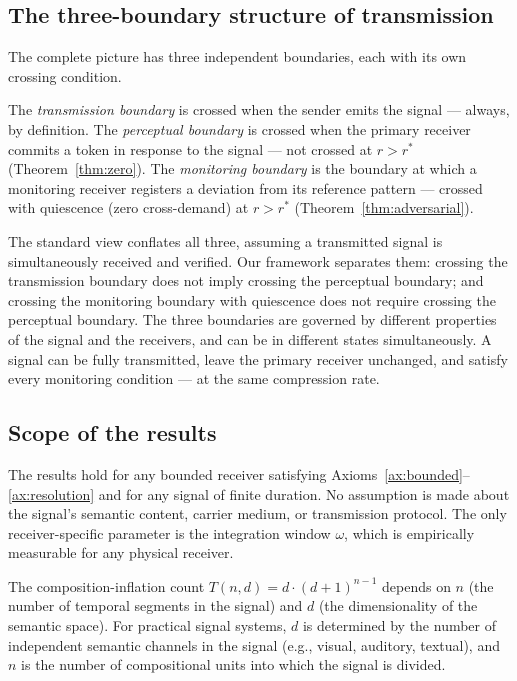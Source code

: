 \documentclass[twocolumn,11pt,a4paper]{article}
\theoremstyle{main}
\theoremstyle{definition}
\theoremstyle{remark}
\newcommand{\Traj}{T}
\newcommand{\rate}{r}
\newcommand{\window}{\omega}
\begin{document}
\subsection{The three-boundary structure of transmission}

The complete picture has three independent boundaries, each with its
own crossing condition.

The \emph{transmission boundary} is crossed when the sender emits the
signal --- always, by definition. The \emph{perceptual boundary} is
crossed when the primary receiver commits a token in response to the
signal --- not crossed at $\rate > \rate^*$
(Theorem~\ref{thm:zero}). The \emph{monitoring boundary} is the
boundary at which a monitoring receiver registers a deviation from
its reference pattern --- crossed with quiescence (zero cross-demand)
at $\rate > \rate^*$ (Theorem~\ref{thm:adversarial}).

The standard view conflates all three, assuming a transmitted signal
is simultaneously received and verified. Our framework separates them:
crossing the transmission boundary does not imply crossing the
perceptual boundary; and crossing the monitoring boundary with
quiescence does not require crossing the perceptual boundary. The
three boundaries are governed by different properties of the signal
and the receivers, and can be in different states simultaneously.
A signal can be fully transmitted, leave the primary receiver
unchanged, and satisfy every monitoring condition --- at the same
compression rate.

\subsection{Scope of the results}

The results hold for any bounded receiver satisfying
Axioms~\ref{ax:bounded}--\ref{ax:resolution} and for any signal of
finite duration. No assumption is made about the signal's semantic
content, carrier medium, or transmission protocol. The only
receiver-specific parameter is the integration window $\window$, which
is empirically measurable for any physical receiver.

The composition-inflation count $\Traj(n,d) = d \cdot (d+1)^{n-1}$
depends on $n$ (the number of temporal segments in the signal) and $d$
(the dimensionality of the semantic space). For practical signal systems,
$d$ is determined by the number of independent semantic channels in the
signal (e.g., visual, auditory, textual), and $n$ is the number of
compositional units into which the signal is divided.
\end{document}

